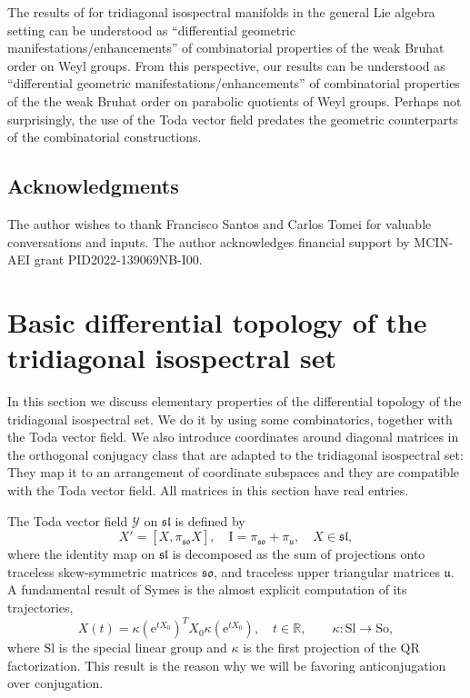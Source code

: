 \documentclass[reqno]{amsart}
\newcommand{\uu}{\mathfrak{u}}
\renewcommand{\sl}{\mathfrak{sl}}
\newcommand{\so}{\mathfrak{so}}
\newcommand{\cY}{\mathcal{Y}}
\newcommand{\R}{\mathbb{R}}
\newcommand{\Sl}{\mathrm{Sl}}
\newcommand{\So}{\mathrm{So}}
\begin{document}
The results of \cite{Da2} for tridiagonal isospectral manifolds in the general Lie algebra setting can be understood as ``differential geometric manifestations/enhancements'' of combinatorial properties of the weak Bruhat order on Weyl groups. From this perspective, our results can be understood as ``differential geometric manifestations/enhancements'' of combinatorial properties of the the weak Bruhat order on parabolic quotients of Weyl groups. Perhaps not surprisingly, the use of the Toda vector field predates the geometric counterparts of the combinatorial constructions.



\subsection*{ Acknowledgments} The author wishes to thank Francisco Santos and Carlos Tomei for valuable conversations and inputs. The author acknowledges  financial support by MCIN-AEI grant PID2022-139069NB-I00.




\section{Basic differential topology of the tridiagonal isospectral set}\label{sec:coordinates-tridiagonal}
In this section we  discuss elementary properties of the differential topology of the tridiagonal isospectral set. We do it by using some combinatorics, together with  the Toda vector field. We also introduce coordinates around diagonal matrices in the orthogonal conjugacy class that are adapted to the tridiagonal isospectral set: They map it to an arrangement of coordinate subspaces  and they are compatible with the Toda vector field. All matrices in this section have real entries.


The Toda vector field $\cY$ on $\sl$ \cite{F} is defined by
\begin{equation}\label{eq:Toda}
X'=[X,\pi_\so X],\quad \mathrm{I}=\pi_\so+ \pi_{\uu},\quad X\in \mathfrak{sl},
\end{equation}
where the identity map  on $\mathfrak{sl}$ is decomposed as the sum of projections
onto traceless skew-symmetric matrices $\so$, and traceless upper triangular matrices $\uu$. A fundamental result of Symes \cite{Sy} is the almost explicit computation of its trajectories,
\[X(t)=\kappa(\mathrm{e}^{tX_0})^TX_0 \kappa(\mathrm{e}^{tX_0}),\quad t\in \R,\qquad \kappa:\Sl\to \So,\]
where $\Sl$ is the special linear group and $\kappa$ is the first projection of the $\mathrm{QR}$ factorization. This result is the reason  why we will be favoring anticonjugation over conjugation.
\end{document}
